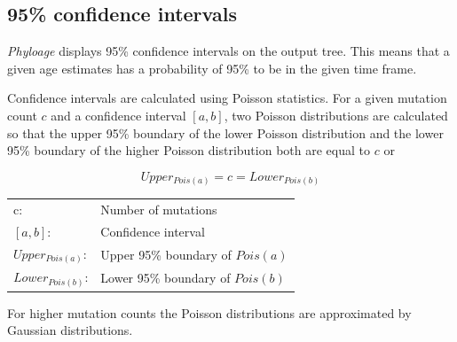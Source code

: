 \subsection{95\% confidence intervals}

\emph{Phyloage} displays 95\% confidence intervals on the
output tree. This means that a given age estimates has a
probability of 95\% to be in the given time frame.

Confidence intervals are calculated using Poisson statistics.
For a given mutation count $c$ and a confidence interval $[a, b]$,
two Poisson distributions are calculated so that the upper
95\% boundary of the lower Poisson distribution and the lower
95\% boundary of the higher Poisson distribution both are equal
to $c$ or

\begin{equation}
Upper_{Pois(a)} = c = Lower_{Pois(b)}
\end{equation}

\begin{tabular}{ll}
c: &  Number of mutations\\
$[a, b]$: &  Confidence interval\\
$Upper_{Pois(a)}$: & Upper 95\% boundary of $Pois(a)$\\
$Lower_{Pois(b)}$: & Lower 95\% boundary of $Pois(b)$
\end{tabular}
\vspace{1em}

For higher mutation counts the Poisson distributions are
approximated by Gaussian distributions.








































